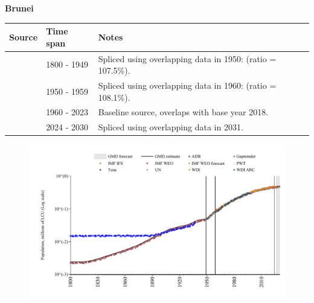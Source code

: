 \documentclass[12pt,a4paper,landscape]{article}
\begin{document}
\begin{adjustbox}{max totalsize={\paperwidth}{\paperheight},center}
\begin{minipage}[t][\textheight][t]{\textwidth}
\vspace*{0.5cm}
{}
\begin{center}
{\Large\bfseries Brunei}
\end{center}
\vspace{0.5cm}
\begin{table}[H]
\centering
\small
\begin{tabular}{|l|l|l|}
\hline
\textbf{Source} & \textbf{Time span} & \textbf{Notes} \\
\hline
\rowcolor{white}\cite{Gapminder}& 1800 - 1949 &Spliced using overlapping data in 1950: (ratio = 107.5\%).\\
\rowcolor{lightgray}\cite{IMF_IFS}& 1950 - 1959 &Spliced using overlapping data in 1960: (ratio = 108.1\%).\\
\rowcolor{white}\cite{WDI}& 1960 - 2023 &Baseline source, overlaps with base year 2018.\\
\rowcolor{lightgray}\cite{Gapminder}& 2024 - 2030 &Spliced using overlapping data in 2031.\\
\hline
\end{tabular}
\end{table}
\begin{figure}[H]
\centering
\includegraphics[width=\textwidth,height=0.6\textheight,keepaspectratio]{graphs/BRN_pop.pdf}
\end{figure}
\end{minipage}
\end{adjustbox}
\end{document}
